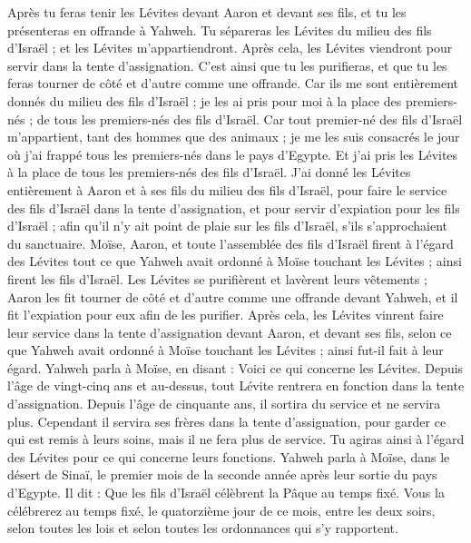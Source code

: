 \begin{multicols}{2}
Après tu feras tenir les Lévites devant Aaron et devant ses fils, et tu les présenteras en offrande à Yahweh.
Tu sépareras les Lévites du milieu des fils d'Israël ; et les Lévites m’appartiendront.
Après cela, les Lévites viendront pour servir dans la tente d'assignation. C’est ainsi que tu les purifieras, et que tu les feras tourner de côté et d’autre comme une offrande.
Car ils me sont entièrement donnés du milieu des fils d'Israël ; je les ai pris pour moi à la place des premiers-nés ; de tous les premiers-nés des fils d'Israël.
Car tout premier-né des fils d'Israël m’appartient, tant des hommes que des animaux ; je me les suis consacrés le jour où j’ai frappé tous les premiers-nés dans le pays d'Egypte.
Et j'ai pris les Lévites à la place de tous les premiers-nés des fils d'Israël.
J'ai donné les Lévites entièrement à Aaron et à ses fils du milieu des fils d'Israël, pour faire le service des fils d'Israël dans la tente d'assignation, et pour servir d’expiation pour les fils d'Israël ; afin qu'il n'y ait point de plaie sur les fils d'Israël, s’ils s'approchaient du sanctuaire.
Moïse, Aaron, et toute l'assemblée des fils d'Israël firent à l’égard des Lévites tout ce que Yahweh avait ordonné à Moïse touchant les Lévites ; ainsi firent les fils d'Israël.
Les Lévites se purifièrent et lavèrent leurs vêtements ; Aaron les fit tourner de côté et d’autre comme une offrande devant Yahweh, et il fit l'expiation pour eux afin de les purifier.
Après cela, les Lévites vinrent faire leur service dans la tente d'assignation devant Aaron, et devant ses fils, selon ce que Yahweh avait ordonné à Moïse touchant les Lévites ; ainsi fut-il fait à leur égard.
Yahweh parla à Moïse, en disant :
Voici ce qui concerne les Lévites. Depuis l'âge de vingt-cinq ans et au-dessus, tout Lévite rentrera en fonction dans la tente d'assignation.
Depuis l'âge de cinquante ans, il sortira du service et ne servira plus.
Cependant il servira ses frères dans la tente d'assignation, pour garder ce qui est remis à leurs soins, mais il ne fera plus de service. Tu agiras ainsi à l’égard des Lévites pour ce qui concerne leurs fonctions.
\TextTitle{[la Pâque]}
\VerseOne{}Yahweh parla à Moïse, dans le désert de Sinaï, le premier mois de la seconde année après leur sortie du pays d'Egypte. Il dit :
Que les fils d'Israël célèbrent la Pâque au temps fixé.
Vous la célébrerez au temps fixé, le quatorzième jour de ce mois, entre les deux soirs, selon toutes les lois et selon toutes les ordonnances qui s’y rapportent.

\end{multicols}
